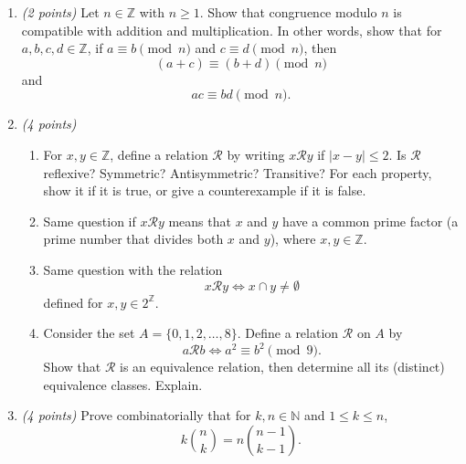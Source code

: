 \documentclass[12pt]{article}
\begin{document}
\begin{enumerate}[itemsep=1.2em]

\item \emph{(2 points)} Let \( n \in \mathbb{Z} \) with \( n \geq 1 \). Show that congruence modulo \( n \) is compatible with addition and multiplication. In other words, show that for \( a, b, c, d \in \mathbb{Z} \), if \( a \equiv b \pmod n \) and \( c \equiv d \pmod n \), then
\[
(a+c) \equiv (b+d) \pmod n
\]
and
\[
ac \equiv bd \pmod n.
\]\newline

\item \emph{(4 points)}

\begin{enumerate}
    \item For \( x, y \in \mathbb{Z} \), define a relation \( \mathcal{R} \) by writing \( x \mathcal{R} y \) if \( |x - y| \leq 2 \). Is \( \mathcal{R} \) reflexive? Symmetric? Antisymmetric? Transitive? For each property, show it if it is true, or give a counterexample if it is false.\newline
    
    \item Same question if \( x \mathcal{R} y \) means that \( x \) and \( y \) have a common prime factor (a prime number that divides both \( x \) and \( y \)), where \( x, y \in \mathbb{Z} \).\newline
    
    \item Same question with the relation
    \[
    x \mathcal{R} y \iff x \cap y \neq \emptyset
    \]
    defined for \( x, y \in 2^{\mathbb{Z}} \).\newline
    
    \item Consider the set \( A = \{0, 1, 2, \dots, 8 \} \). Define a relation \( \mathcal{R} \) on \( A \) by
    \[
    a \mathcal{R} b \iff a^2 \equiv b^2 \pmod 9.
    \]
    Show that \( \mathcal{R} \) is an equivalence relation, then determine all its (distinct) equivalence classes. Explain. \newline
    
\end{enumerate}

\item \emph{(4 points)} Prove combinatorially that for \( k, n \in \mathbb{N} \) and \( 1 \leq k \leq n \),
\[
k \binom{n}{k} = n \binom{n-1}{k-1}.
\] \newline


\end{enumerate}
\end{document}
